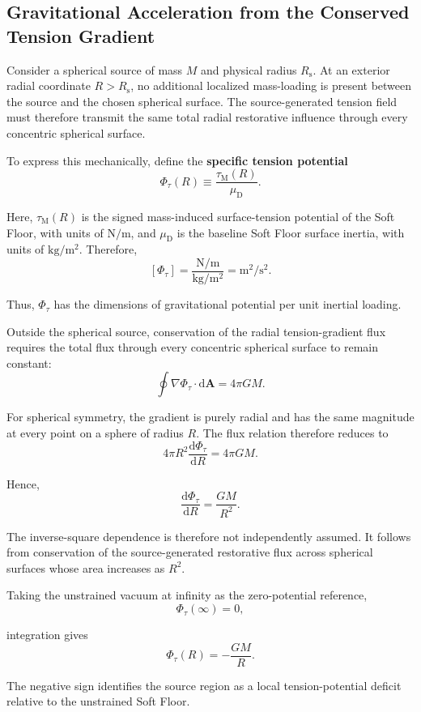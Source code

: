 \subsection{Gravitational Acceleration from the Conserved Tension Gradient}

Consider a spherical source of mass $M$ and physical radius $R_{\mathrm{s}}$. At an exterior radial coordinate $R > R_{\mathrm{s}}$, no additional localized mass-loading is present between the source and the chosen spherical surface. The source-generated tension field must therefore transmit the same total radial restorative influence through every concentric spherical surface.

To express this mechanically, define the \textbf{specific tension potential}
$$\Phi_{\tau}(R) \equiv \frac{\tau_{\mathrm{M}}(R)}{\mu_{\mathrm{D}}}.$$

Here, $\tau_{\mathrm{M}}(R)$ is the signed mass-induced surface-tension potential of the Soft Floor, with units of $\mathrm{N/m}$, and $\mu_{\mathrm{D}}$ is the baseline Soft Floor surface inertia, with units of $\mathrm{kg/m^2}$. Therefore,
$$[\Phi_{\tau}] = \frac{\mathrm{N/m}}{\mathrm{kg/m^2}} = \mathrm{m^2/s^2}.$$

Thus, $\Phi_{\tau}$ has the dimensions of gravitational potential per unit inertial loading.

Outside the spherical source, conservation of the radial tension-gradient flux requires the total flux through every concentric spherical surface to remain constant:
$$\oint \nabla\Phi_{\tau} \cdot \mathrm{d}\mathbf{A} = 4\pi GM.$$

For spherical symmetry, the gradient is purely radial and has the same magnitude at every point on a sphere of radius $R$. The flux relation therefore reduces to
$$4\pi R^2 \frac{\mathrm{d}\Phi_{\tau}}{\mathrm{d}R} = 4\pi GM.$$

Hence,
$$\frac{\mathrm{d}\Phi_{\tau}}{\mathrm{d}R} = \frac{GM}{R^2}.$$

The inverse-square dependence is therefore not independently assumed. It follows from conservation of the source-generated restorative flux across spherical surfaces whose area increases as $R^2$.

Taking the unstrained vacuum at infinity as the zero-potential reference,
$$\Phi_{\tau}(\infty) = 0,$$

integration gives
$$\Phi_{\tau}(R) = -\frac{GM}{R}.$$

The negative sign identifies the source region as a local tension-potential deficit relative to the unstrained Soft Floor.


